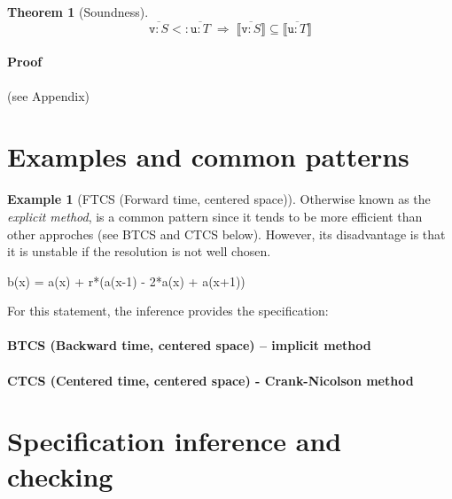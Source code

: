 \documentclass[9pt]{sigplanconf}
\newcounter{block}
\theoremstyle{definition}
\newtheorem{theorem}[block]{Theorem}
\newtheorem{example}[block]{Example}
\newcommand{\interp}[1]{\llbracket{#1}\rrbracket}
\begin{document}
\begin{theorem}[Soundness]
\[
\overline{\texttt{v} : S} <: \overline{\texttt{u} : T}
\; \Rightarrow \;
\interp{\overline{\texttt{v} : S}} \subseteq \interp{\overline{\texttt{u} : T}}
\]
\end{theorem}

\paragraph{Proof} (see Appendix)



\section{Examples and common patterns}

\begin{example}[FTCS (Forward time, centered space)]

  Otherwise known as the \emph{explicit method}, is a common
  pattern since it tends to be more efficient than other approches
  (see BTCS and CTCS below). However, its disadvantage is that it is
  unstable if the resolution is not well chosen.

\begin{ExmVerbatim}
b(x) = a(x) + r*(a(x-1) - 2*a(x) + a(x+1))
\end{ExmVerbatim}
%
For this statement, the inference provides the specification:
%
\begin{SpecVerbatim}
\end{SpecVerbatim}



\end{example}

\paragraph{BTCS (Backward time, centered space) -- implicit method}

\paragraph{CTCS (Centered time, centered space) - Crank-Nicolson method}

\section{Specification inference and checking}
\label{sec:analysis}
\end{document}
